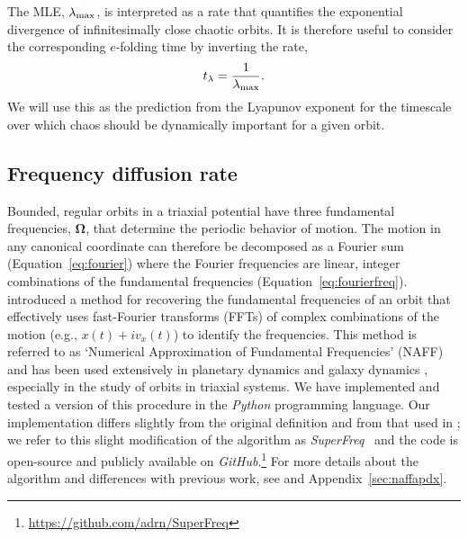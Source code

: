 \documentclass[letterpaper,12pt,preprint]{aastex}
\newcommand{\bs}[1]{\boldsymbol{#1}}
\newcommand{\project}[1]{\textsl{#1}}
\newcommand{\superfreq}{\project{SuperFreq}}
\begin{document}
The MLE, $\lambda_{\rm max}$, is interpreted as a rate that quantifies the exponential divergence of infinitesimally close chaotic orbits. It is therefore useful to consider the corresponding $e$-folding time by inverting the rate,
\begin{equation}
	t_{\rm \lambda} = \frac{1}{\lambda_{\rm max}}.
\end{equation}
We will use this as the prediction from the Lyapunov exponent for the timescale over which chaos should be dynamically important for a given orbit. 

\subsection{Frequency diffusion rate}\label{sec:naff}

Bounded, regular orbits in a triaxial potential have three fundamental frequencies, $\bs{\Omega}$, that determine the periodic behavior of motion. The motion in any canonical coordinate can therefore be decomposed as a Fourier sum (Equation~\ref{eq:fourier}) where the Fourier frequencies are linear, integer combinations of the fundamental frequencies (Equation~\ref{eq:fourierfreq}). \cite{laskar93} introduced a method for recovering the fundamental frequencies of an orbit that effectively uses fast-Fourier transforms (FFTs) of complex combinations of the motion (e.g., $x(t) + i v_x(t)$) to identify the frequencies. This method is referred to as `Numerical Approximation of Fundamental Frequencies' (NAFF) and has been used extensively in planetary dynamics \citep[e.g.,][]{laskar93b, laskar96} and galaxy dynamics \citep{papaphilippou98, valluri98}, especially in the study of orbits in triaxial systems. We have implemented and tested a version of this procedure in the \project{Python} programming language. Our implementation differs slightly from the original definition and from that used in \cite{valluri98}; we refer to this slight modification of the algorithm as \superfreq\ \citep{superfreq} and the code is open-source and publicly available on \project{GitHub}.\footnote{\url{https://github.com/adrn/SuperFreq}} For more details about the algorithm and differences with previous work, see \cite{laskar88, laskar93, papaphilippou96} and Appendix~\ref{sec:naffapdx}. 
\end{document}
